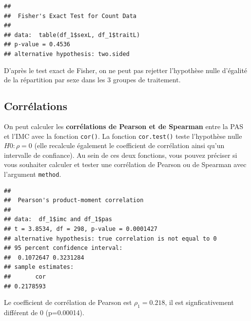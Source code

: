 \documentclass[
]{book}
\newenvironment{Shaded}{\begin{snugshade}}{\end{snugshade}}
\newcommand{\AttributeTok}[1]{\textcolor[rgb]{0.13,0.29,0.53}{#1}}
\newcommand{\DocumentationTok}[1]{\textcolor[rgb]{0.56,0.35,0.01}{\textbf{\textit{#1}}}}
\newcommand{\FunctionTok}[1]{\textcolor[rgb]{0.13,0.29,0.53}{\textbf{#1}}}
\newcommand{\NormalTok}[1]{#1}
\newcommand{\OtherTok}[1]{\textcolor[rgb]{0.56,0.35,0.01}{#1}}
\newcommand{\SpecialCharTok}[1]{\textcolor[rgb]{0.81,0.36,0.00}{\textbf{#1}}}
\newcommand{\StringTok}[1]{\textcolor[rgb]{0.31,0.60,0.02}{#1}}
\begin{document}
\begin{verbatim}
## 
##  Fisher's Exact Test for Count Data
## 
## data:  table(df_1$sexL, df_1$traitL)
## p-value = 0.4536
## alternative hypothesis: two.sided
\end{verbatim}

D'après le test exact de Fisher, on ne peut pas rejetter l'hypothèse nulle d'égalité de la répartition par sexe dans les 3 groupes de traitement.

\subsection{Corrélations}\label{corruxe9lations}

On peut calculer les \textbf{corrélations de Pearson et de Spearman} entre la PAS et l'IMC avec la fonction \texttt{cor()}. La fonction \texttt{cor.test()} teste l'hypothèse nulle \(H0: \rho = 0\) (elle recalcule également le coefficient de corrélation ainsi qu'un intervalle de confiance). Au sein de ces deux fonctions, vous pouvez préciser si vous souhaiter calculer et tester une corrélation de Pearson ou de Spearman avec l'argument \texttt{method}.

\begin{Shaded}
\end{Shaded}

\begin{verbatim}
## 
##  Pearson's product-moment correlation
## 
## data:  df_1$imc and df_1$pas
## t = 3.8534, df = 298, p-value = 0.0001427
## alternative hypothesis: true correlation is not equal to 0
## 95 percent confidence interval:
##  0.1072647 0.3231284
## sample estimates:
##       cor 
## 0.2178593
\end{verbatim}

Le coefficient de corrélation de Pearson est \(\rho_1 = 0.218\), il est signficativement différent de 0 (p=0.00014).

\begin{Shaded}
\end{Shaded}
\end{document}
